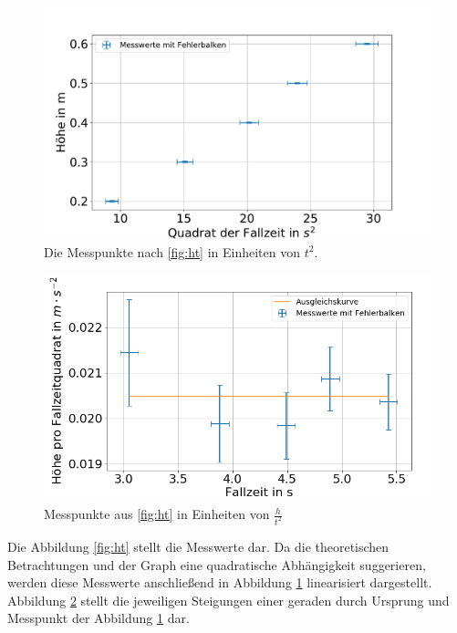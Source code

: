 \begin{figure}[h!]
	\centering
	\includegraphics[width=0.9\linewidth]{auswertung/Fallrad/h,t^2}
	\caption{Die Messpunkte nach \cref{fig:ht} in Einheiten von $t^2$. }
	\label{fig:ht2}
\end{figure}

\begin{figure}[h!]
	\centering
	\includegraphics[width=0.9\linewidth]{auswertung/Fallrad/T,ht^-2}
	\caption{Messpunkte aus \cref{fig:ht} in Einheiten von $\frac{h}{t^2}$}
	\label{fig:tht-2}
\end{figure}





Die Abbildung \ref{fig:ht} stellt die Messwerte dar. Da die theoretischen Betrachtungen und der Graph eine quadratische Abhängigkeit suggerieren, werden diese Messwerte anschließend in Abbildung \ref{fig:ht2} linearisiert dargestellt. Abbildung \ref{fig:tht-2} stellt die jeweiligen Steigungen einer geraden durch Ursprung und Messpunkt der Abbildung \ref{fig:ht2} dar. \\






